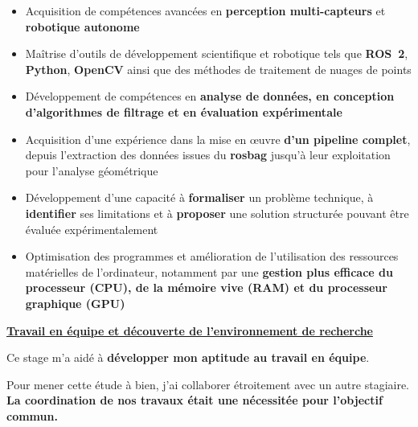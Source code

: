 \documentclass[12pt,a4paper,oneside]{report}
\begin{document}
\begin{itemize}[itemsep=0.2em, label=\textbullet]
    \item Acquisition de compétences avancées en \textbf{perception multi-capteurs} et \textbf{robotique autonome }
    
    \item Maîtrise d'outils de développement scientifique et robotique tels que \textbf{ROS~2}, \textbf{Python}, \textbf{OpenCV} ainsi que des méthodes de traitement de nuages de points 
    
    \item Développement de compétences en \textbf{analyse de données, en conception d'algorithmes de filtrage et en évaluation expérimentale}
    
    \item Acquisition d'une expérience dans la mise en œuvre \textbf{d'un pipeline complet}, depuis l'extraction des données issues du \textbf{rosbag} jusqu'à leur exploitation pour l'analyse géométrique 
    
    \item Développement d'une capacité à \textbf{formaliser} un problème technique, à \textbf{identifier} ses limitations et à \textbf{proposer} une solution structurée pouvant être évaluée expérimentalement

    \item Optimisation des programmes et amélioration de l'utilisation des ressources matérielles de l'ordinateur, notamment par une \textbf{gestion plus efficace du processeur (CPU), de la mémoire vive (RAM) et du processeur graphique (GPU)}
\end{itemize}


\vspace{0.5cm}

\noindent\textbf{\uline{\large {Travail en équipe et découverte de l'environnement de recherche}}}\par
\medskip

\vspace{0.1cm}

\hspace*{1cm}Ce stage m'a aidé à \textbf{développer mon aptitude au travail en équipe}. \vspace{0.01cm}

\hspace*{0.5cm}Pour mener cette étude à bien, j'ai collaborer étroitement avec un autre stagiaire.\\
\textbf{La coordination de nos travaux était une nécessitée pour l'objectif commun.\vspace{0.01cm}}
\end{document}
